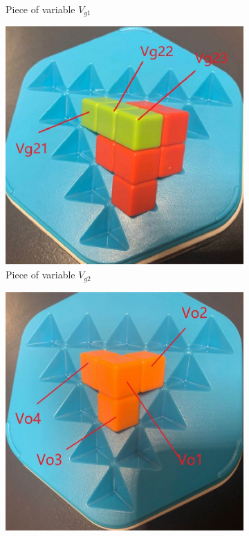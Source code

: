 \begin{figure}[htbp]
\begin{subfigure}[b]{0.25\textwidth}
\caption{Piece of variable $V_{g1}$}
  \label{fig:3Dgreen1}
\end{subfigure}
\begin{subfigure}[b]{0.25\textwidth}
\centering
\includegraphics[width=\textwidth]{figs/3Dgreen2.jpg}
\caption{Piece of variable $V_{g2}$}
  \label{fig:3Dgreen2}
\end{subfigure}
\begin{subfigure}[b]{0.25\textwidth}
\centering
\includegraphics[width=\textwidth]{figs/3Dorange.jpg}

\end{subfigure}
\end{figure}
